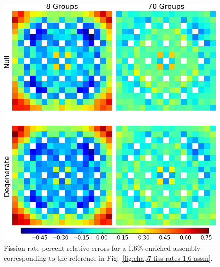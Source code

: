 \begin{figure}[h!]
\centering
\includegraphics[width=\linewidth]{figures/quantification/assm-16/fiss-err}
\vspace{2mm}
\caption[Fission rate errors for a 1.6\% enriched assembly]{Fission rate percent relative errors for a 1.6\% enriched assembly corresponding to the reference in Fig.~\ref{fig:chap7-fiss-rates-1.6-assm}.}
\label{fig:chap8-assm-1.6-fiss-err}
\end{figure}

\clearpage

